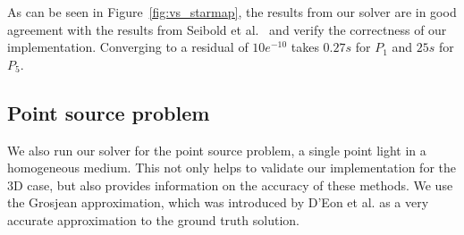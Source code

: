 As can be seen in Figure~\ref{fig:vs_starmap}, the results from our solver are in good agreement with the results from Seibold et al.~\cite{Seibold14} and verify the correctness of our implementation. Converging to a residual of $10e^{-10}$ takes $0.27s$ for $P_1$ and $25s$ for $P_5$.

\subsection{Point source problem}

We also run our solver for the point source problem, a single point light in a homogeneous medium. This not only helps to validate our implementation for the 3D case, but also provides information on the accuracy of these methods. We use the Grosjean approximation, which was introduced by D'Eon et al.\cite{dEon11} as a very accurate approximation to the ground truth solution.

